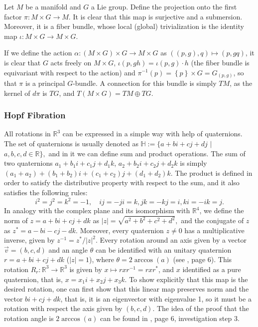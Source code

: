 \documentclass[12pt, letterpaper, reqno]{amsart}
\theoremstyle{definition}
\theoremstyle{plain}
\theoremstyle{remark}
\begin{document}
Let $ M$ be a manifold and $ G $ a Lie group. Define the projection onto the first factor $ \pi: M\times G \rightarrow M. $ It is clear that this map is surjective and a submersion. Moreover, it is a fiber bundle, whose local (global) trivialization is the identity map $ \iota : M\times G \rightarrow M\times G $.   

If we define the action $ \alpha: (M\times G) \times G \rightarrow M\times G $ as $ ((p, g),q)\mapsto (p,gq)  $, it is clear that $ G $ acts freely on $ M\times G $, $\iota(p, gh) = \iota(p,g)\cdot h $ (the fiber bundle is equivariant with respect to the action) and $ \pi^{-1}(p) = \left\{ p \right\}\times G = G_{(p,g)} $, so that $ \pi $ is a principal $ G $-bundle. A connection for this bundle is simply $ TM $, as the kernel of $ d\pi $ is $ TG $, and $ T(M\times G) = TM\oplus TG.$      
\subsubsection{Hopf Fibration}%
\label{ssub:hopf_fibration}

All rotations in $ \mathbb{R}^3 $ can be expressed in a simple way with help of quaternions. The set of quaternions is usually denoted as $ \mathbb{H} := \{ a+bi+cj+dj$  $|$  $a,b,c,d\in \mathbb{R} \}, $ and in it we can define sum and product operations. The sum of two quaternions $ a_1+b_1 i +c_1 j  + d_1k $, $ a_2+b_2 i +c_2 j  + d_2k $ is simply $ (a_1+a_2)+(b_1+b_2)i+(c_1+c_2)j+(d_1+d_2)k. $ The product is defined in order to satisfy the distributive property with respect to the sum, and it also satisfies the following rules: 
$$ i^2=j^2=k^2=-1, \quad ij=-ji=k, jk=-kj=i, ki = -ik=j.  $$ 
In analogy with the complex plane and its isomorphism with $\mathbb{R}^4$, we define the norm of $ z= a+bi+cj+dk $ as $ |z|=\sqrt{a^2+b^2+c^2+d^2}, $ and the conjugate of $ z $ as $ z^* = a-bi-cj-dk. $ Moreover, every quaternion $ z\neq 0 $ has a multiplicative inverse, given by $ z^{-1} = z^*/|z|^2. $ Every rotation around an axis given by a vector $ \vec{v}=(b,c,d) $ and an angle $ \theta $ can be identified with an unitary quaternion $r = a+bi+cj+dk$ ($|z|=1$),  where $ \theta = 2\arccos(a) $ (see \cite{lyons2003elementary}, page 6). This rotation $ R_r: \mathbb{R}^3 \rightarrow\mathbb{R}^3 $ is given by $ x\mapsto rxr^{-1}= rxr^*$, and $ x $ identified as a pure quaternion, that is, $ x=x_1i+x_2j+x_3k. $ To show explicitly that this map is the desired rotation, one can first show that this linear map preserves norm and the vector $ bi+cj+dk $, that is, it is an eigenvector with eigenvalue 1, so it must be a rotation with respect the axis given by $ (b,c,d) $. The idea of the proof that the rotation angle is $ 2\arccos(a) $ can be found in \cite{lyons2003elementary}, page 6, investigation step 3. 
\end{document}
